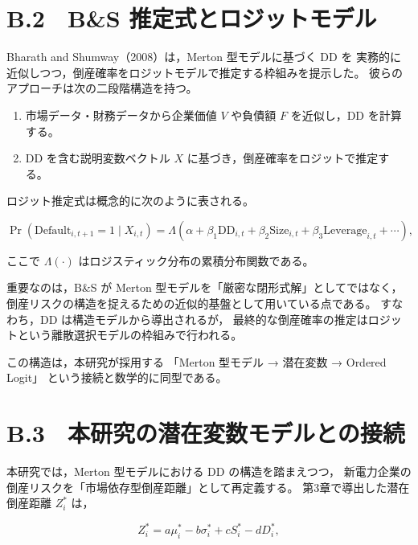 \section*{B.2　B\&S 推定式とロジットモデル}

Bharath and Shumway（2008）は，Merton 型モデルに基づく DD を
実務的に近似しつつ，倒産確率をロジットモデルで推定する枠組みを提示した。
彼らのアプローチは次の二段階構造を持つ。

\begin{enumerate}
  \item 市場データ・財務データから企業価値 $V$ や負債額 $F$ を近似し，DD を計算する。
  \item DD を含む説明変数ベクトル $X$ に基づき，倒産確率をロジットで推定する。
\end{enumerate}

ロジット推定式は概念的に次のように表される。



\[
\Pr(\text{Default}_{i,t+1}=1 \mid X_{i,t})
=
\Lambda\left(
\alpha + \beta_1 \text{DD}_{i,t} + \beta_2 \text{Size}_{i,t}
+ \beta_3 \text{Leverage}_{i,t} + \cdots
\right),
\]



ここで $\Lambda(\cdot)$ はロジスティック分布の累積分布関数である。

重要なのは，B\&S が Merton 型モデルを「厳密な閉形式解」としてではなく，
倒産リスクの構造を捉えるための近似的基盤として用いている点である。
すなわち，DD は構造モデルから導出されるが，
最終的な倒産確率の推定はロジットという離散選択モデルの枠組みで行われる。

この構造は，本研究が採用する
「Merton 型モデル → 潜在変数 → Ordered Logit」
という接続と数学的に同型である。

\section*{B.3　本研究の潜在変数モデルとの接続}

本研究では，Merton 型モデルにおける DD の構造を踏まえつつ，
新電力企業の倒産リスクを「市場依存型倒産距離」として再定義する。
第3章で導出した潜在倒産距離 $Z^{\ast}_i$ は，



\[
Z^{\ast}_i
=
a \mu^{\ast}_i - b \sigma^{\ast}_i + c S^{\ast}_i - d D^{\ast}_i,
\]



